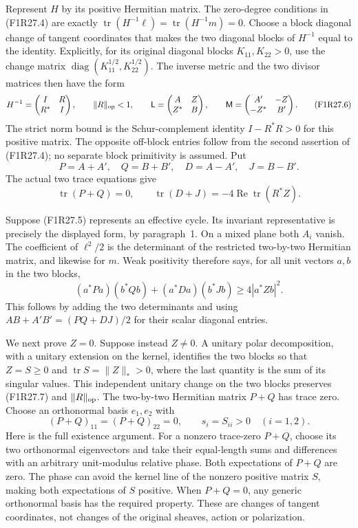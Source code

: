Represent $H$ by its positive Hermitian matrix.
The zero-degree conditions in (F1R27.4) are
exactly $\operatorname{tr}(H^{-1}\ell)=
\operatorname{tr}(H^{-1}m)=0$.
Choose a block diagonal change of tangent
coordinates that makes the two diagonal
blocks of $H^{-1}$ equal to the identity.
Explicitly, for its original diagonal blocks
$K_{11},K_{22}>0$, use the change matrix
$\operatorname{diag}(K_{11}^{1/2},K_{22}^{1/2})$.
The inverse metric and the two divisor matrices
then have the form
\[
 H^{-1}=\begin{pmatrix}I&R\\R^*&I\end{pmatrix},
 \qquad \|R\|_{\rm op}<1,\qquad
 \mathsf L=\begin{pmatrix}A&Z\\Z^*&B\end{pmatrix},
 \qquad
 \mathsf M=\begin{pmatrix}A'&-Z\\-Z^*&B'\end{pmatrix}.
 \tag{F1R27.6}
\]
The strict norm bound is the Schur-complement
identity $I-R^*R>0$ for this positive matrix.
The opposite off-block entries follow from
the second assertion of (F1R27.4); no separate
block primitivity is assumed.
Put
\[
 P=A+A',\quad Q=B+B',\quad D=A-A',\quad J=B-B'.
\]
The actual two trace equations give
\[
       \operatorname{tr}(P+Q)=0,\qquad
       \operatorname{tr}(D+J)
                    =-4\operatorname{Re}\operatorname{tr}(R^*Z).
 \tag{F1R27.7}
\]

Suppose (F1R27.5) represents an effective cycle.
Its invariant representative is precisely
the displayed form, by paragraph~1. On a mixed
plane both $A_i$ vanish. The coefficient of
$\ell^2/2$ is the determinant of the restricted
two-by-two Hermitian matrix, and likewise for
$m$. Weak positivity therefore says, for all
unit vectors $a,b$ in the two blocks,
\[
   (a^*Pa)(b^*Qb)+(a^*Da)(b^*Jb)
                              \ge4|a^*Zb|^2.
 \tag{F1R27.8}
\]
This follows by adding the two determinants
and using
$AB+A'B'=(PQ+DJ)/2$ for their scalar diagonal
entries.

We next prove $Z=0$. Suppose instead $Z\ne0$.
A unitary polar decomposition, with a unitary
extension on the kernel, identifies the two
blocks so that $Z=S\ge0$ and
$\operatorname{tr}S=\|Z\|_*>0$, where the last
quantity is the sum of its singular values.
This independent unitary change on the two
blocks preserves (F1R27.7) and $\|R\|_{\rm op}$.
The two-by-two Hermitian matrix $P+Q$ has
trace zero. Choose an orthonormal basis
$e_1,e_2$ with
\[
          (P+Q)_{11}=(P+Q)_{22}=0,
                   \qquad s_i=S_{ii}>0\quad(i=1,2).
 \tag{F1R27.9}
\]
Here is the full existence argument. For a
nonzero trace-zero $P+Q$, choose its two
orthonormal eigenvectors and take their
equal-length sums and differences with an
arbitrary unit-modulus relative phase.
Both expectations of $P+Q$ are zero.
The phase can avoid the kernel line of
the nonzero positive matrix $S$, making both
expectations of $S$ positive.
When $P+Q=0$, any generic orthonormal basis
has the required property. These are changes
of tangent coordinates, not changes of the
original sheaves, action or polarization.

